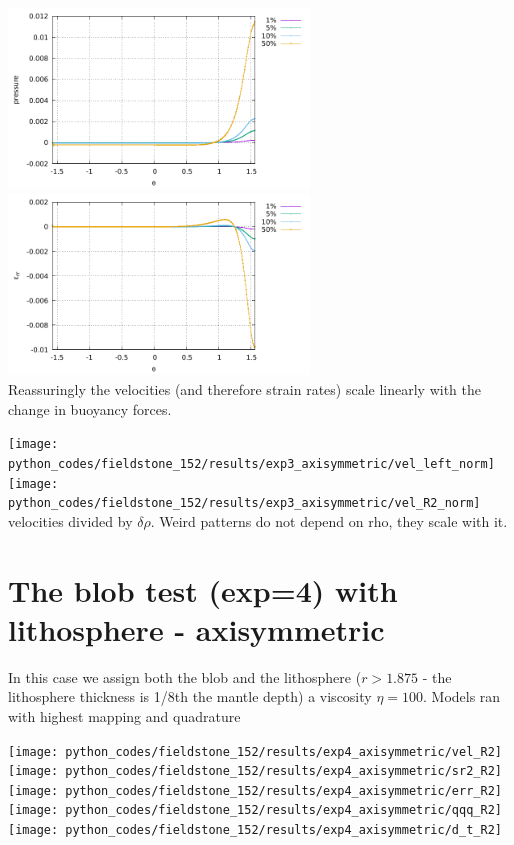 \begin{center}
\includegraphics[width=8cm]{python_codes/fieldstone_152/results/exp3_axisymmetric/p_R2}
\includegraphics[width=8cm]{python_codes/fieldstone_152/results/exp3_axisymmetric/err_R2}\\
{\captionfont Reassuringly the velocities (and therefore strain rates) scale linearly with the 
change in buoyancy forces.}
\end{center}


\begin{center}
\texttt{[image: python\_codes/fieldstone\_152/results/exp3\_axisymmetric/vel\_left\_norm]}
\texttt{[image: python\_codes/fieldstone\_152/results/exp3\_axisymmetric/vel\_R2\_norm]}\\
{\captionfont velocities divided by $\delta\rho$. Weird patterns do not depend on rho, they scale with it.}
\end{center}


\newpage
\section*{The blob test (exp=4)  with lithosphere - axisymmetric}

In this case we assign both the blob and the lithosphere ($r>1.875$ - the lithosphere
thickness is 1/8th the mantle depth) a viscosity $\eta=100$.
Models ran with highest mapping and quadrature

\begin{center}
\texttt{[image: python\_codes/fieldstone\_152/results/exp4\_axisymmetric/vel\_R2]}
\texttt{[image: python\_codes/fieldstone\_152/results/exp4\_axisymmetric/sr2\_R2]}\\
\texttt{[image: python\_codes/fieldstone\_152/results/exp4\_axisymmetric/err\_R2]}
\texttt{[image: python\_codes/fieldstone\_152/results/exp4\_axisymmetric/qqq\_R2]}\\
\texttt{[image: python\_codes/fieldstone\_152/results/exp4\_axisymmetric/d\_t\_R2]}
\end{center}

